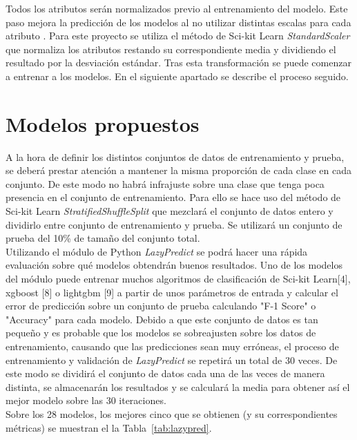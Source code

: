 \documentclass{esannV2}
\begin{document}
Todos los atributos serán normalizados previo al entrenamiento del modelo. Este paso mejora la predicción de los modelos al no utilizar distintas escalas para cada atributo . Para este proyecto se utiliza el método de Sci-kit Learn  \textit{StandardScaler} que normaliza los atributos restando su correspondiente media y dividiendo el resultado por la desviación estándar. Tras esta transformación se puede comenzar a entrenar a los modelos. En el siguiente apartado se describe el proceso seguido.

\section{Modelos propuestos}

A la hora de definir los distintos conjuntos de datos de entrenamiento y prueba, se deberá prestar atención a mantener la misma proporción de cada clase en cada conjunto. De este modo no habrá infrajuste sobre una clase que tenga poca presencia en el conjunto de entrenamiento. Para ello se hace uso del método de Sci-kit Learn \textit{StratifiedShuffleSplit} que mezclará el conjunto de datos entero y dividirlo entre conjunto de entrenamiento y prueba. Se utilizará un conjunto de prueba del 10\% de tamaño del conjunto total.\\

Utilizando el módulo de  Python \textit{LazyPredict} se podrá hacer una rápida evaluación sobre qué modelos obtendrán buenos resultados. Uno de los modelos del módulo puede entrenar muchos algoritmos de clasificación de Sci-kit Learn[4], xgboost [8] o lightgbm [9] a partir de unos parámetros de entrada y calcular el error de predicción sobre un conjunto de prueba calculando "F-1 Score" o "Accuracy" para cada modelo. 
Debido a que este conjunto de datos es tan pequeño y es probable que los modelos se sobreajusten sobre los datos de entrenamiento, causando que las predicciones sean muy erróneas, el proceso de entrenamiento y validación de   \textit{LazyPredict}  se repetirá un total de 30 veces. De este modo se dividirá el conjunto de datos cada una de las veces de manera distinta, se almacenarán los resultados y se calculará la media para obtener así el mejor modelo sobre las 30 iteraciones. \\ 

Sobre los 28 modelos, los mejores cinco que se obtienen (y su correspondientes métricas) se muestran el la Tabla~\ref{tab:lazypred}. \\
\end{document}
